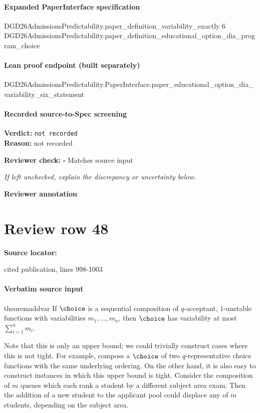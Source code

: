 \documentclass[10pt]{article}
\newcommand{\reviewerbox}{%
  \par\noindent\fbox{\parbox{0.96\linewidth}{\rule{0pt}{0.38in}}}\par
}
\newcommand{\reviewmatch}[1]{%
  \par\noindent\textbf{Reviewer check:} $\square$\; #1\par
  \noindent\emph{If left unchecked, explain the discrepancy or uncertainty below.}\par
}
\begin{document}
\paragraph{Expanded PaperInterface specification}
\begin{ReviewVerbatim}
DGD26AdmissionsPredictability.paper_definition_variability_exactly 6
  DGD26AdmissionsPredictability.paper_definition_educational_option_dia_program_choice
\end{ReviewVerbatim}

\paragraph{Lean proof endpoint (built separately)}\begin{ReviewVerbatim}
DGD26AdmissionsPredictability.PaperInterface.paper_educational_option_dia_variability_six_statement
\end{ReviewVerbatim}

\paragraph{Recorded source-to-Spec screening}
\textbf{Verdict:} \texttt{not recorded}
\\
\textbf{Reason:} not recorded
\reviewmatch{Matches source input}
\noindent\textbf{Reviewer annotation}\par
\reviewerbox
\clearpage
\hypertarget{source-claim-207dcf4700d4343b}{}
\section*{Review row 48}
\textbf{Source locator:} {\footnotesize\raggedright cited publication, lines 998-\allowbreak{}1003\par}
\paragraph{Verbatim source input}
\begin{ReviewVerbatim}
\begin{restatable}{theorem}{addvar}
\label{thm:additive-variability}
If $\choice$ is a sequential composition of $q$-acceptant, $1$-unstable functions with variabilities $m_1, \ldots, m_n$, then $\choice$ has variability at most $\sum_{i=1}^n m_i$.
\end{restatable}

Note that this is only an upper bound; we could trivially construct cases where this is not tight. For example, compose a $\choice$ of two $q$-representative choice functions with the same underlying ordering. On the other hand, it is also easy to construct instances in which this upper bound is tight. Consider the composition of $m$ queues which each rank a student by a different subject area exam. Then the addition of a new student to the applicant pool could displace any of $m$ students, depending on the subject area.
\end{ReviewVerbatim}
\end{document}
